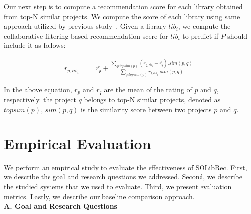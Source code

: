\documentclass[paper]{ieice}
\begin{document}
Our next step is to compute a recommendation score for each library obtained from top-N similar projects. We compute the score of each library using same approach utilized by previous study~\cite{di2015recommender}. Given a library $lib_i$, we compute the collaborative filtering based recommendation score for $lib_i$ to predict if $P$ should include it as follows:

\begin{eqnarray}
    r_{p,lib_{i}} & = & \overline{r_{p}}+ \frac{\sum_{q\epsilon topsim(p)} (r_{q, lib_{i}}-\overline{r_{q}}).sim(p,q)}{\sum_{q\epsilon topsim(p)} r_{q, lib_{i}}.sim(p,q)}
\end{eqnarray}

In the above equation, $\overline{r_{p}}$ and $\overline{r_{q}}$ are the mean of the rating of $p$ and $q$, respectively. the project $q$ belongs to top-N similar projects, denoted as $topsim(p)$, $sim(p,q)$ is the similarity score between two projects $p$ and $q$.
 


\section{Empirical Evaluation}
\label{sec:evaluation}
We perform an empirical study to evaluate the effectiveness of SOLibRec. First, we describe the goal and research questions we addressed. Second, we describe the studied systems that we used to evaluate. Third, we present evaluation metrics. Lastly, we describe our baseline comparison approach.
\\

\noindent\textbf{A. Goal and Research Questions}\\
\end{document}
